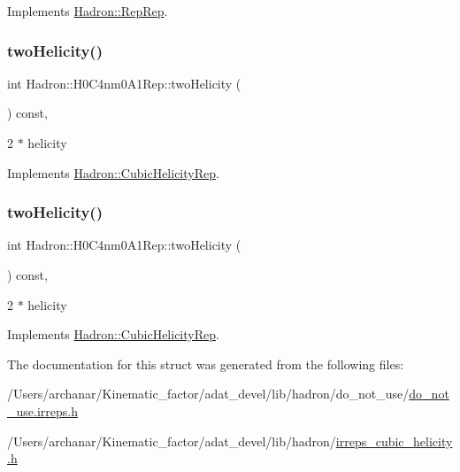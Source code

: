 Implements \mbox{\hyperlink{structHadron_1_1RepRep_ab3213025f6de249f7095892109575fde}{Hadron\+::\+Rep\+Rep}}.

\mbox{\label{structHadron_1_1H0C4nm0A1Rep_a24164f53b9067951c0c9fa30be36ca8b}} 
\subsubsection{\texorpdfstring{twoHelicity()}{twoHelicity()}\hspace{0.1cm}{\footnotesize\ttfamily [1/2]}}
{\footnotesize\ttfamily int Hadron\+::\+H0\+C4nm0\+A1\+Rep\+::two\+Helicity (\begin{DoxyParamCaption}{ }\end{DoxyParamCaption}) const\hspace{0.3cm}{\ttfamily [inline]}, {\ttfamily [virtual]}}

2 $\ast$ helicity 

Implements \mbox{\hyperlink{structHadron_1_1CubicHelicityRep_af507aa56fc2747eacc8cb6c96db31ecc}{Hadron\+::\+Cubic\+Helicity\+Rep}}.

\mbox{\label{structHadron_1_1H0C4nm0A1Rep_a24164f53b9067951c0c9fa30be36ca8b}} 
\subsubsection{\texorpdfstring{twoHelicity()}{twoHelicity()}\hspace{0.1cm}{\footnotesize\ttfamily [2/2]}}
{\footnotesize\ttfamily int Hadron\+::\+H0\+C4nm0\+A1\+Rep\+::two\+Helicity (\begin{DoxyParamCaption}{ }\end{DoxyParamCaption}) const\hspace{0.3cm}{\ttfamily [inline]}, {\ttfamily [virtual]}}

2 $\ast$ helicity 

Implements \mbox{\hyperlink{structHadron_1_1CubicHelicityRep_af507aa56fc2747eacc8cb6c96db31ecc}{Hadron\+::\+Cubic\+Helicity\+Rep}}.



The documentation for this struct was generated from the following files\+:\begin{DoxyCompactItemize}
\item 
/\+Users/archanar/\+Kinematic\+\_\+factor/adat\+\_\+devel/lib/hadron/do\+\_\+not\+\_\+use/\mbox{\hyperlink{do__not__use_8irreps_8h}{do\+\_\+not\+\_\+use.\+irreps.\+h}}\item 
/\+Users/archanar/\+Kinematic\+\_\+factor/adat\+\_\+devel/lib/hadron/\mbox{\hyperlink{lib_2hadron_2irreps__cubic__helicity_8h}{irreps\+\_\+cubic\+\_\+helicity.\+h}}\end{DoxyCompactItemize}
